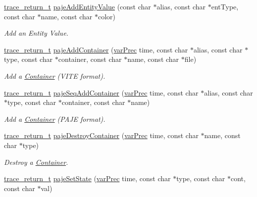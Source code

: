 \begin{DoxyCompactItemize}
\hyperlink{group__type_ga1f1b68fb37d7331f03a48ef0993a0788}{trace\-\_\-return\-\_\-t} \hyperlink{group__cpaje_ga1a280796147680d73b4148de463200a6}{paje\-Add\-Entity\-Value} (const char $\ast$alias, const char $\ast$ent\-Type, const char $\ast$name, const char $\ast$color)
\begin{DoxyCompactList}\small\item\em Add an Entity Value. \end{DoxyCompactList}\item 
\hyperlink{group__type_ga1f1b68fb37d7331f03a48ef0993a0788}{trace\-\_\-return\-\_\-t} \hyperlink{group__cpaje_ga78d90b40b97cb072ab6634bbfd562dc6}{paje\-Add\-Container} (\hyperlink{group__type_gabda13d5bcd0cbdb094d655181a857e25}{var\-Prec} time, const char $\ast$alias, const char $\ast$type, const char $\ast$container, const char $\ast$name, const char $\ast$file)
\begin{DoxyCompactList}\small\item\em Add a \hyperlink{structContainer}{Container} (V\-I\-T\-E format). \end{DoxyCompactList}\item 
\hyperlink{group__type_ga1f1b68fb37d7331f03a48ef0993a0788}{trace\-\_\-return\-\_\-t} \hyperlink{group__cpaje_gaccb7f379b053e7a5d6cc3f04b929e1d9}{paje\-Seq\-Add\-Container} (\hyperlink{group__type_gabda13d5bcd0cbdb094d655181a857e25}{var\-Prec} time, const char $\ast$alias, const char $\ast$type, const char $\ast$container, const char $\ast$name)
\begin{DoxyCompactList}\small\item\em Add a \hyperlink{structContainer}{Container} (P\-A\-J\-E format). \end{DoxyCompactList}\item 
\hyperlink{group__type_ga1f1b68fb37d7331f03a48ef0993a0788}{trace\-\_\-return\-\_\-t} \hyperlink{group__cpaje_gaa2404d741e681fa9a90309798ccdd005}{paje\-Destroy\-Container} (\hyperlink{group__type_gabda13d5bcd0cbdb094d655181a857e25}{var\-Prec} time, const char $\ast$name, const char $\ast$type)
\begin{DoxyCompactList}\small\item\em Destroy a \hyperlink{structContainer}{Container}. \end{DoxyCompactList}\item 
\hyperlink{group__type_ga1f1b68fb37d7331f03a48ef0993a0788}{trace\-\_\-return\-\_\-t} \hyperlink{group__cpaje_ga6f836611123e0a83ec764aefebf4ec33}{paje\-Set\-State} (\hyperlink{group__type_gabda13d5bcd0cbdb094d655181a857e25}{var\-Prec} time, const char $\ast$type, const char $\ast$cont, const char $\ast$val)

\end{DoxyCompactItemize}
